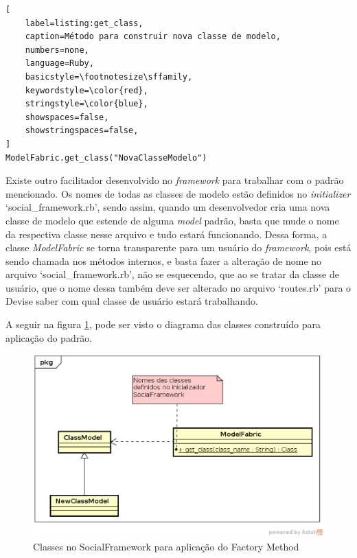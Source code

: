 \begin{lstlisting}[
    label=listing:get_class,
    caption=Método para construir nova classe de modelo,
    numbers=none,
    language=Ruby,
    basicstyle=\footnotesize\sffamily,
    keywordstyle=\color{red},
    stringstyle=\color{blue},
    showspaces=false,
    showstringspaces=false,
]
ModelFabric.get_class("NovaClasseModelo")
\end{lstlisting}

Existe outro facilitador desenvolvido no \textit{framework} para trabalhar com o padrão mencionado. Os nomes de todas as classes de modelo estão definidos no \textit{initializer} `social\_framework.rb', sendo assim, quando um desenvolvedor cria uma nova classe de modelo que estende de alguma \textit{model} padrão, basta que mude o nome da respectiva classe nesse arquivo e tudo estará funcionando. Dessa forma, a classe \textit{ModelFabric} se torna transparente para um usuário do \textit{framework}, pois está sendo chamada nos métodos internos, e basta fazer a alteração de nome no arquivo `social\_framework.rb', não se esquecendo, que ao se tratar da classe de usuário, que o nome dessa também deve ser alterado no arquivo `routes.rb' para o Devise saber com qual classe de usuário estará trabalhando.

A seguir na figura \ref{padrao_factory_method}, pode ser visto o diagrama das classes construído para aplicação do padrão.

\begin{figure}[h]
    \centering
    \includegraphics[scale=0.6]{figuras/social_framework/factory_method.eps}
    \caption{Classes no SocialFramework para aplicação do Factory Method}
    \label{padrao_factory_method}
\end{figure}

